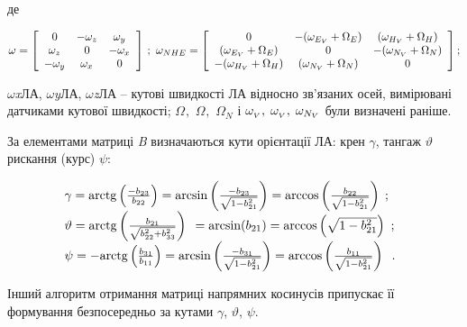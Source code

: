 де 

\[\omega_{{\rm }} =\left[\begin{array}{ccc} {0} & {-\omega_{z_{{\rm }} } } & {
\omega_{y_{{\rm }} } } \\ {\omega_{z_{{\rm }} } } & {0} & {-\omega_{x_{{\rm }} 
} } \\ {-\omega_{y_{{\rm }} } } & {\omega_{x_{{\rm }} } } & {0} \end{array}\right]
\, ;\, \, \omega_{NHE} =\left[\begin{array}{ccc} {0} & {-(\omega_{E_{V} } +\Omega 
_{E} )} & {(\omega_{H_{V} } +\Omega_{H} )} \\ {(\omega_{E_{V} } +\Omega_{E} )} 
& {0} & {-(\omega_{N_{V} } +\Omega_{N} )} \\ {-(\omega_{H_{V} } +\Omega_{H} )} 
& {(\omega_{N_{V} } +\Omega_{N} )} & {0} \end{array}\right];\] 

$\omega$\textit{x}ЛА, $\omega$\textit{y}ЛА, $\omega$\textit{z}ЛА  -- кутові 
швидкості ЛА відносно зв'язаних осей, вимірювані датчиками кутової швидкості; $\Omega 
_{} ,\, \, \Omega_{} ,\, \, \Omega_{N} $ і $\omega_{_{V} } ,{\rm \; }\omega_{_{V} 
} ,{\rm \; }\omega_{N_{V} } $ були визначені раніше.

За елементами матриці  \textit{B} визначаються кути орієнтації ЛА:   крен $\gamma$, тангаж 
$\vartheta$ рискання (курс) $\psi $: 

\begin{equation} \label{eq:__8_17_} \begin{array}{l} {\gamma ={\rm arctg}\left(
\frac{-b_{23} }{b_{22} } \right)={\rm arcsin}\left(\frac{-b_{23} }{\sqrt{1-b_{21}^{2} 
} } \right)={\rm arccos}\left(\frac{b_{22} }{\sqrt{1-b_{21}^{2} } } \right)\; ;\, 
} \\ {\vartheta ={\rm arctg}\left(\frac{b_{21} }{\sqrt{b_{22}^{2} +b_{33}^{2} } } 
\right){\rm \; }={\rm arcsin(}b_{21} {\rm )}={\rm arccos}\left(\sqrt{1-b_{21}^{2} 
} \right)\, \, ;\, } \\ {\psi =-{\rm arctg}\left(\frac{b_{31} }{b_{11} } \right)={
\rm arcsin}\left(\frac{-b_{31} }{\sqrt{1-b_{21}^{2} } } \right)={\rm arccos}\left(
\frac{b_{11} }{\sqrt{1-b_{21}^{2} } } \right){\rm \; \; }.\, \, \, \, } \end{array} \end{equation} 

Інший 
алгоритм отримання матриці напрямних косинусів припускає її  формування безпосередньо 
за кутами  $\gamma$, $\vartheta$, $\psi$. 

